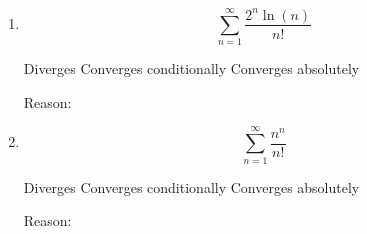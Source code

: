 \documentclass[12pt]{article}
\newcommand{\emptybox}[2][\textwidth]{%
	\begingroup
	\setlength{\fboxsep}{-\fboxrule}%
	\noindent\framebox[#1]{\rule{0pt}{#2}}%
	\endgroup
}
\theoremstyle{definition}
\theoremstyle{remark}
\begin{document}
\begin{enumerate}
    \item   \begin{equation*}
        \sum\limits_{n=1}^\infty \frac{2^n\ln(n)}{n!}
    \end{equation*}
    \begin{center}
    	\raisebox{-.3\height}{\emptybox[.25in]{.25in}} Diverges \hspace{.5 in} \raisebox{-.3\height}{\emptybox[.25in]{.25in}} Converges conditionally \hspace{.5 in} \raisebox{-.3\height}{\emptybox[.25in]{.25in}} Converges absolutely
    \end{center}  
    Reason:
    \vfill
    \vfill

    \item \begin{equation*}
        \sum\limits_{n=1}^\infty \frac{n^n}{n!}
    \end{equation*}
    \begin{center}
    	\raisebox{-.3\height}{\emptybox[.25in]{.25in}} Diverges \hspace{.5 in} \raisebox{-.3\height}{\emptybox[.25in]{.25in}} Converges conditionally \hspace{.5 in} \raisebox{-.3\height}{\emptybox[.25in]{.25in}} Converges absolutely
    \end{center}  
    Reason:
    \vfill
    \vfill


\end{enumerate}
\end{document}
